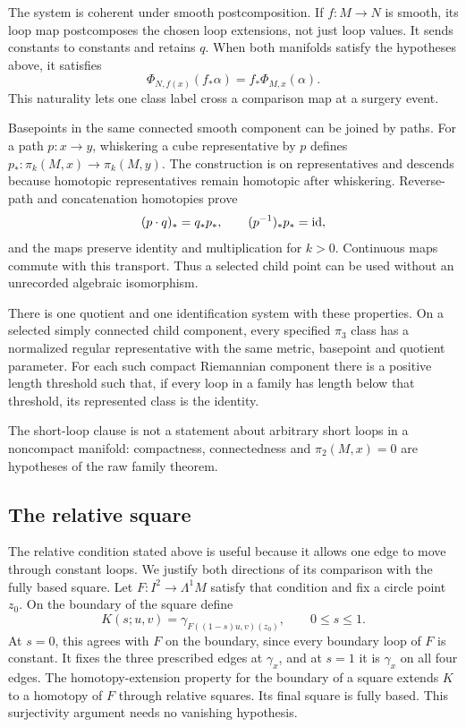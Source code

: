 The system is coherent under smooth postcomposition. If $f:M\to N$ is
smooth, its loop map postcomposes the chosen loop extensions, not just loop
values. It sends constants to constants and retains $q$. When both
manifolds satisfy the hypotheses above, it satisfies
\[
 \Phi_{N,f(x)}(f_*\alpha)=f_*\Phi_{M,x}(\alpha).
\]
This naturality lets one class label cross a comparison map at a surgery
event.

Basepoints in the same connected smooth component can be joined by paths.
For a path $p:x\to y$, whiskering a cube representative by $p$
defines $p_*:\pi_k(M,x)\to\pi_k(M,y)$. The construction is on representatives
and descends because homotopic representatives remain homotopic after
whiskering. Reverse-path and concatenation homotopies prove
\[
 (p\mathbin{\cdot}q)_*=q_*p_*,\qquad (p^{-1})_*p_*={\rm id},
\]
and the maps preserve identity and multiplication for $k>0$. Continuous maps
commute with this transport. Thus a selected child point can be used without
an unrecorded algebraic isomorphism.

\begin{proposition}
\label{prop:filling-loop-identification}
There is one quotient and one identification system with these properties. On
a selected simply connected child component, every specified $\pi_3$ class has a
normalized regular representative with the same metric, basepoint and
quotient parameter. For each such compact Riemannian component there is
a positive length threshold such that, if every loop in a family has
length below that threshold, its represented class is the identity.
\end{proposition}

The short-loop clause is not a statement about arbitrary short loops in a
noncompact manifold: compactness, connectedness and $\pi_2(M,x)=0$ are
hypotheses of the raw family theorem.

\subsection{The relative square}
\label{sec:filling-relative-square}

The relative condition stated above is useful because it allows one edge
to move through constant loops. We justify both directions of its
comparison with the fully based square. Let $F:I^2\to\Lambda^1M$
satisfy that condition and fix a circle point $z_0$. On the boundary of
the square define
\[
 K(s;u,v)=\gamma_{F((1-s)u,v)(z_0)},\qquad 0\leq s\leq1.
\]
At $s=0$, this agrees with $F$ on the boundary, since every boundary
loop of $F$ is constant. It fixes the three prescribed edges at
$\gamma_x$, and at $s=1$ it is $\gamma_x$ on all four edges.
The homotopy-extension property for the boundary of a square extends
$K$ to a homotopy of $F$ through relative squares. Its final square is
fully based. This surjectivity argument needs no vanishing hypothesis.

